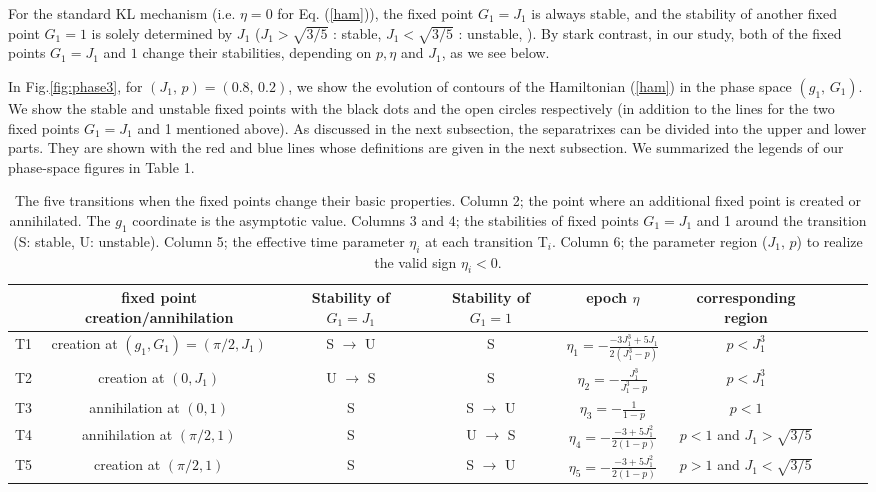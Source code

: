 \documentclass[useAMS,usenatbib,twocolumn]{mn2e}
\begin{document}
For the standard KL mechanism (i.e. $\eta=0$ for Eq. (\ref{ham})), the fixed point $G_1=J_1$ is always stable, and the stability of another fixed point $G_1=1$ is solely determined by $J_1$ 
($J_1>\sqrt{3/5}$ : stable, $J_1<\sqrt{3/5}$ : unstable, \citealt{kozai1962,lidov1962}). 
By stark contrast, in our study, both of the fixed points $G_1=J_1$ and $1$ change their stabilities, depending on $p,\eta$ and $J_1$, as we see below. 



In Fig.\ref{fig:phase3},  for $(J_1,\,p)=(0.8,\,0.2)$,  we show the evolution of contours of the Hamiltonian (\ref{ham}) in the phase space $(g_1, \,G_1)$. We show the stable and unstable fixed points with the black dots and the  open circles respectively (in addition to the lines for the two fixed points $G_1=J_1$ and 1 mentioned above).
As discussed in the next subsection, the separatrixes can be divided into the upper and lower parts. 
They are shown with the  red and blue lines whose definitions are given in the next subsection. We summarized the legends of
our phase-space figures in Table 1.

\begin{table*}
\caption{The five transitions when the fixed points  change  their basic properties.  Column 2; the point where an additional  fixed point is created or annihilated. The $g_1$ coordinate is the asymptotic value. Columns 3 and 4;   the stabilities of fixed points $G_1=J_1$ and 1 around the transition (S: stable, U: unstable). Column 5; the effective time parameter $\eta_i$ at each transition T$_i$. Column 6;   the parameter region ($J_1,\,p$) to realize the valid sign $\eta_i<0$.}
\label{tab:2}
\begin{tabular}{lcccccccc}
\hline
 &fixed point creation/annihilation & Stability of $G_1=J_1$ & Stability of $G_1=1$ & epoch $\eta$ & corresponding region\\
\hline
 T1 & creation at $(g_1,G_1)=(\pi/2,J_1)$ & S $\rightarrow$ U & S & $\eta_1=-\frac{-3J_{1}^{3}+5J_1}{2(J_{1}^3-p)}$ &  $p<J_{1}^3$\\
T2 &creation at $(0,J_1)$ &  U $\rightarrow$ S & S & $\eta_2=-\frac{J_{1}^3}{J_{1}^3-p}$ &  $p<J_{1}^3$\\
T3 &annihilation at $(0,1)$ & S &  S $\rightarrow$ U & $\eta_3=-\frac{1}{1-p}$ &  $p<1$\\
T4 &annihilation at $(\pi/2,1)$ & S & U $\rightarrow$ S  & $\eta_4=-\frac{-3+5J_{1}^2}{2(1-p)}$ & $p<1$ and $J_1>\sqrt{3/5}$\\
T5 &creation at $(\pi/2,1)$ & S &  S $\rightarrow$ U  & $\eta_5=-\frac{-3+5J_{1}^2}{2(1-p)}$  & $p>1$ and $J_{1}<\sqrt{3/5}$\\
\hline
\end{tabular}
\end{table*}
\end{document}
